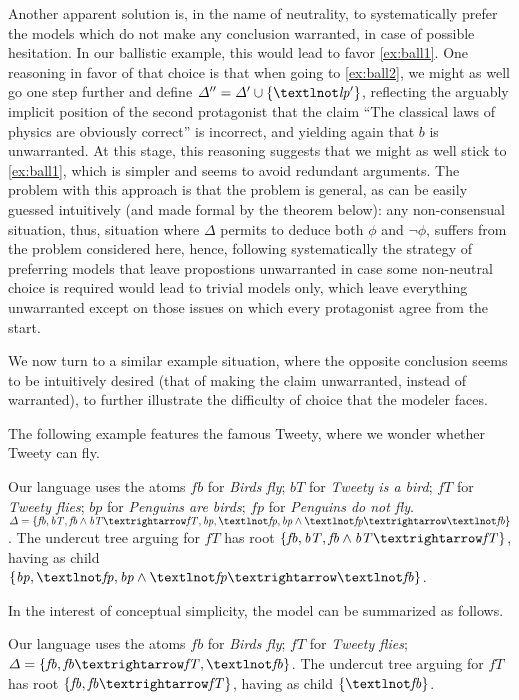 \documentclass[version=3.21, pagesize, twoside=off, bibliography=totoc, DIV=calc, fontsize=12pt, a4paper, french, english]{scrartcl}
\begin{document}
Another apparent solution is, in the name of neutrality, to systematically prefer the models which do not make any conclusion warranted, in case of possible hesitation. In our ballistic example, this would lead to favor \cref{ex:ball1}. One reasoning in favor of that choice is that when going to \cref{ex:ball2}, we might as well go one step further and define $\Delta^{\prime\prime} = \Delta' \cup \set{\mathit{¬lp'}}$, reflecting the arguably implicit position of the second protagonist that the claim “The classical laws of physics are obviously correct” is incorrect, and yielding again that $b$ is unwarranted. At this stage, this reasoning suggests that we might as well stick to \cref{ex:ball1}, which is simpler and seems to avoid redundant arguments. The problem with this approach is that the problem is general, as can be easily guessed intuitively (and made formal by the theorem below): any non-consensual situation, thus, situation where $\Delta$ permits to deduce both $\phi$ and $¬\phi$, suffers from the problem considered here, hence, following systematically the strategy of preferring models that leave propostions unwarranted in case some non-neutral choice is required would lead to trivial models only, which leave everything unwarranted except on those issues on which every protagonist agree from the start. 

We now turn to a similar example situation, where the opposite conclusion seems to be intuitively desired (that of making the claim unwarranted, instead of warranted), to further illustrate the difficulty of choice that the modeler faces.

The following example features the famous Tweety, where we wonder whether Tweety can fly.
\begin{example}
	\label{ex:fullTweety}
	Our language uses the atoms 
	$\mathit{fb}$ for \emph{Birds fly}; 
	$\mathit{bT}$ for \emph{Tweety is a bird}; 
	$\mathit{fT}$ for \emph{Tweety flies}; 
	$\mathit{bp}$ for \emph{Penguins are birds}; 
	$\mathit{fp}$ for \emph{Penguins do not fly}.
	$\Delta = \set{\mathit{fb}, \mathit{bT},\allowbreak \mathit{fb} \land \mathit{bT} → \mathit{fT}, \mathit{bp}, ¬\mathit{fp},\allowbreak \mathit{bp} \land ¬\mathit{fp} → ¬\mathit{fb}}$.
	The undercut tree arguing for $\mathit{fT}$ has root $\set{\mathit{fb},\allowbreak \mathit{bT},\allowbreak \mathit{fb} \land \mathit{bT} → \mathit{fT}}$, having as child $\set{\mathit{bp},\allowbreak ¬\mathit{fp},\allowbreak \mathit{bp} \land ¬\mathit{fp} → ¬\mathit{fb}}$.
\end{example}
In the interest of conceptual simplicity, the model can be summarized as follows.
\begin{example}
	\label{ex:shortTweety}
	Our language uses the atoms 
	$\mathit{fb}$ for \emph{Birds fly}; 
	$\mathit{fT}$ for \emph{Tweety flies}; 
	$\Delta = \set{\mathit{fb},\allowbreak \mathit{fb} → \mathit{fT}, ¬\mathit{fb}}$.
	The undercut tree arguing for $\mathit{fT}$ has root $\set{\mathit{fb},\allowbreak \mathit{fb} → \mathit{fT}}$, having as child $\set{¬\mathit{fb}}$.
\end{example}
\end{document}
